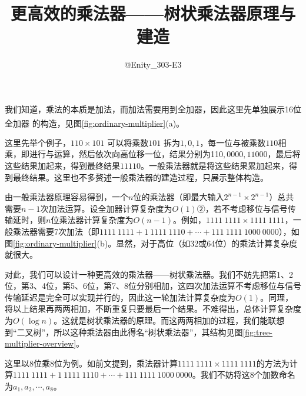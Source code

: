 \documentclass[UTF8,12pt,punct=kaiming,fontset=none]{ctexart}
\title{\vspace{-1.5cm}更高效的乘法器——树状乘法器原理与建造\vspace{-0.5cm}}
\author{@Enity\_303-E3}
\date{}
\newcommand*{\upcite}[1]{
    \textsuperscript{\cite{#1}}
}
\begin{document}
    \maketitle
    \thispagestyle{fancy} %
    \vspace{-0.7cm}

    \titleformat{\section}[hang]{\large\sffamily\bfseries}{\textmd{\thesection}}{0.5cm}{}
    \titlespacing{\section}{0cm}{0.5ex}{0.2ex}
    \setcounter{section}{-1}

    我们知道，乘法的本质是加法，而加法需要用到全加器，因此这里先单独展示16位全加器\upcite{full_adder}的构造，见图\ref{fig:ordinary-multiplier}(a)。

    这里先举个例子，$110\times101$ 可以将乘数$101$ 拆为$1,0,1$，每一位与被乘数$110$相乘，即进行与运算，然后依次向高位移一位，结果分别为11$0,0000,11000$，最后将这些结果加起来，得到最终结果$11110$。一般乘法器就是将这些结果累加起来，得到最终结果。这里也不多赘述一般乘法器的建造过程，只展示整体构造。

    由一般乘法器原理容易得到，一个$n$位的乘法器（即最大输入$2^{n-1}\times2^{n-1}$）总共需要$n-1$次加法运算。设全加器计算复杂度为$O(1)$②，若不考虑移位与信号传输延时，则$n$位乘法器计算复杂度为$O(n-1)$。例如，$1111\ 1111\times1111\ 1111$，一般乘法器需要7次加法（即$1111\ 1111+1\ 1111\ 1110+\cdots+111\ 1111\ 1000\ 0000$），如图\ref{fig:ordinary-multiplier}(b)。显然，对于高位（如32或64位）的乘法计算复杂度就很大。
    
    对此，我们可以设计一种更高效的乘法器——树状乘法器。我们不妨先把第1、2位，第3、4位，第5、6位，第7、8位分别相加，这四次加法运算不考虑移位与信号传输延迟是完全可以实现并行的，因此这一轮加法计算复杂度为$O(1)$。同理，将以上结果再两两相加，不断重复只要最后一个结果。不难得出，总体计算复杂度为$O(\log n)$。这就是树状乘法器的原理。而这两两相加的过程，我们能联想到“二叉树”，所以这种乘法器由此得名“树状乘法器”，其结构见图\ref{fig:tree-multiplier-overview}。

    这里以8位乘8位为例。如前文提到，乘法器计算$1111\ 1111\times1111\ 1111$的方法为计算$1111\ 1111+1\ 1111\ 1110+\cdots+111\ 1111\ 1000\ 0000$。我们不妨将这8个加数命名为$a_1,a_2,\cdots,a_8$。
\end{document}
